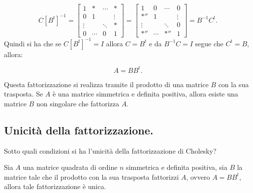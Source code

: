 \[
C\left[B^t\right]^{-1} =
\left[
\begin{array}{cccc}
1 & * & \cdots & * \\
0 & 1 & & \vdots \\
\vdots & & \ddots & * \\
0 &\cdots & 0 & 1
\end{array}
\right] =
\left[
\begin{array}{cccc}
1 & 0 & \cdots & 0 \\
*'' & 1 & & \vdots \\
\vdots & & \ddots & 0 \\
*'' &\cdots & *'' & 1
\end{array}
\right] = B^{-1}C^t.
\]
Quindi si ha che se $C\left[B^t\right]^{-1} = I$ allora $C = B^t$ e da
$B^{-1}C = I$ segue che $C^t = B$, allora:

\[A = BB^t.\]

Questa fattorizzazione si realizza tramite il prodotto di una matrice $B$ con
la sua trasposta. Se $A$ è una matrice simmetrica e definita positiva, allora
esiste una matrice $B$ non singolare che fattorizza $A$.

\subsection{Unicità della fattorizzazione.}
Sotto quali condizioni si ha l'unicità della fattorizzazione di Cholesky?

\begin{teo}
Sia $A$ una matrice quadrata di ordine $n$ simmetrica e definita positiva,
sia $B$ la matrice tale che il prodotto con la sua trasposta fattorizzi $A$,
ovvero $A = BB^t$, allora tale fattorizzazione è unica.
\end{teo}


